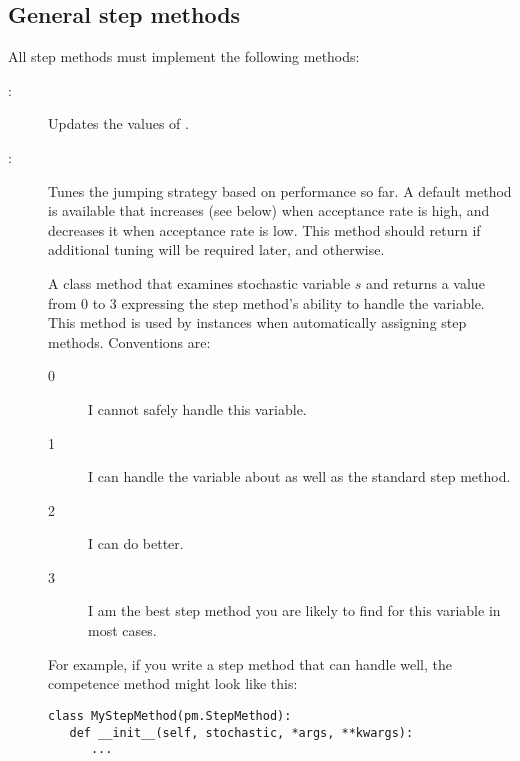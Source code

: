 \hypertarget{user-gen}{}
\subsection*{General step methods} \label{user-gen}

All step methods must implement the following methods:
\begin{description}
   \item[:] Updates the values of .
   \item[:] Tunes the jumping strategy based on performance so far. A default method is available that increases  (see below) when acceptance rate is high, and decreases it when acceptance rate is low. This method should return  if additional tuning will be required later, and  otherwise.
   \item[] A class method that examines stochastic variable $s$ and returns a value from 0 to 3 expressing the step method's ability to handle the variable. This method is used by  instances when automatically assigning step methods. Conventions are:
   \begin{description}
      \item[0] I cannot safely handle this variable. 
      \item[1] I can handle the variable about as well as the standard  step method.
      \item[2] I can do better.
      \item[3] I am the best step method you are likely to find for this variable in most cases.
   \end{description}
   For example, if you write a step method that can handle  well, the competence method might look like this:
\begin{verbatim}
class MyStepMethod(pm.StepMethod):
   def __init__(self, stochastic, *args, **kwargs):
      ...
   

\end{verbatim}
\end{description}
